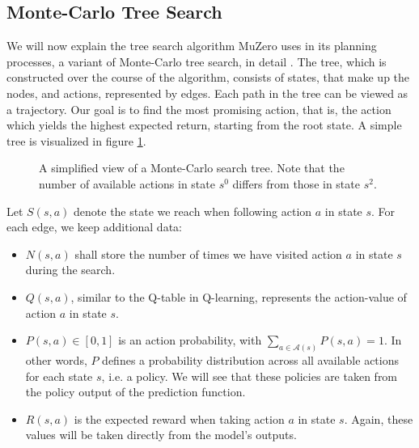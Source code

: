 \newcommand{\argmax}{\operatornamewithlimits{argmax}}

\subsection{Monte-Carlo Tree Search}
We will now explain the tree search algorithm MuZero uses in its planning processes, a variant of Monte-Carlo tree search, in detail \cite{alphazero, muzero}. The tree, which is constructed over the course of the algorithm, consists of states, that make up the nodes, and actions, represented by edges. Each path in the tree can be viewed as a trajectory. Our goal is to find the most promising action, that is, the action which yields the highest expected return, starting from the root state. A simple tree is visualized in figure \ref{fig:mcts_simple}.
\begin{figure}[ht]
    \centering
    \caption{A simplified view of a Monte-Carlo search tree. Note that the number of available actions in state $s^0$ differs from those in state $s^2$.}
    \label{fig:mcts_simple}
\end{figure}

Let $S(s, a)$ denote the state we reach when following action $a$ in state $s$. For each edge, we keep additional data:
\begin{itemize}
    \item $N(s, a)$ shall store the number of times we have visited action $a$ in state $s$ during the search.
    \item $Q(s, a)$, similar to the Q-table in Q-learning, represents the action-value of action $a$ in state $s$.
    \item $P(s, a) \in [0, 1]$ is an action probability, with $\sum_{a \in \mathscr{A}(s)} P(s, a) = 1$. In other words, $P$ defines a probability distribution across all available actions for each state $s$, i.e. a policy. We will see that these policies are taken from the policy output of the prediction function.
    \item $R(s, a)$ is the expected reward when taking action $a$ in state $s$. Again, these values will be taken directly from the model's outputs.
\end{itemize}

